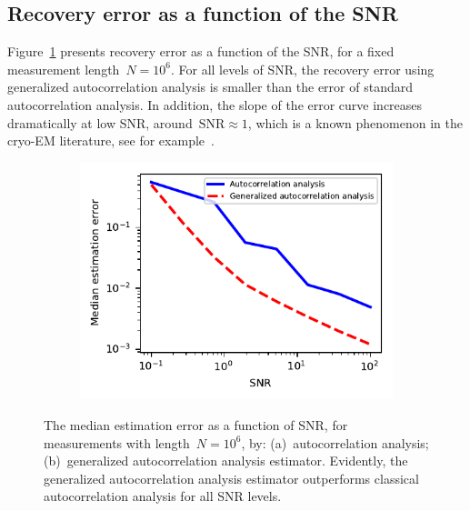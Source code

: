 \documentclass{article}
\begin{document}
\subsection{Recovery error as a function of the SNR}
\label{subsec:exp_SNR}
Figure~\ref{fig:err_noise_experiment} presents recovery error as a function of {the} SNR, for a fixed measurement length~$N = 10^6$. For all levels of SNR, the recovery error using  generalized autocorrelation analysis  is smaller than the error of standard autocorrelation analysis. In addition, the slope of the error curve increases dramatically at low SNR, around~\mbox{$\text{SNR} \approx 1$}, which is a known phenomenon in the \mbox{cryo-EM} literature, see for example~\cite{sigworth1998maximum,abbe2018multireference,perry2019sample}.


\begin{figure}[!tb]
	\begin{subfigure}[ht]{\columnwidth}
		\centering
		\includegraphics[width=0.8\columnwidth, keepaspectratio]{figures/experiment_SNR_err.pdf}
	\end{subfigure}
	\caption{The median estimation error as a function of SNR, for measurements with length~\mbox{$N = 10^6$}, by: (a)~autocorrelation analysis; (b)~generalized autocorrelation analysis estimator. Evidently, the generalized autocorrelation analysis estimator outperforms classical autocorrelation analysis for all SNR levels.}
	\label{fig:err_noise_experiment}
\end{figure}
\end{document}
